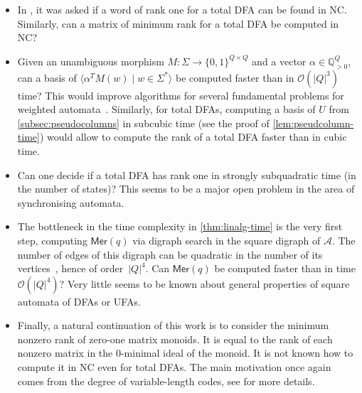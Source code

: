 \documentclass[11pt,a4paper]{amsart}
\newcommand{\OO}{\mathcal{O}}
\newcommand{\Aa}{\mathcal{A}}
\newcommand{\NC}{\textnormal{\textsf{NC}}\xspace}
\newcommand{\spn}[1]{\mathord{\langle #1 \rangle}}
\newcommand{\Mer}{\mathsf{Mer}}
\theoremstyle{plain}
\theoremstyle{definition}
\theoremstyle{defC}
\theoremstyle{thmC}
\theoremstyle{plain}
\numberwithin{equation}{section}
\begin{document}
\begin{itemize}
    \item In \cite{Eppstein1990}, it was asked if a word of rank one for a total DFA can be found in \NC. Similarly, can a matrix of minimum rank for a total DFA be computed in \NC?

    \item Given an unambiguous morphism $M \colon \Sigma \to \{0, 1\}^{Q \times Q}$ and a vector $\alpha \in \mathbb{Q}_{>0}^Q$, can a basis of  $\spn{\alpha^T M(w) \mid w \in \Sigma^*}$ be computed faster than in $\OO(|Q|^3)$ time? This would improve algorithms for several fundamental problems for weighted automata~\cite{KieferWeighted20}. Similarly, for total DFAs, computing a basis of $U$ from \autoref{subsec:pseudocolumns} in subcubic time (see the proof of \autoref{lem:pseudcolumn-time}) would allow to compute the rank of a total DFA faster than in cubic time.

    \item Can one decide if a total DFA has rank one in strongly subquadratic time (in the number of states)? This seems to be a major open problem in the area of synchronising automata.
    
    \item The bottleneck in the time complexity in \autoref{thm:linalg-time} is the very first step, computing $\Mer(q)$ via digraph search in the square digraph of $\Aa$. The number of edges of this digraph can be quadratic in the number of its vertices~\cite[Appendix A]{Kiefer2019Arxiv}, hence of order~$|Q|^4$. Can $\Mer(q)$ be computed faster than in time $\OO(|Q|^4)$? Very little seems to be known about general properties of square automata of DFAs or UFAs.

    \item Finally, a natural continuation of this work is to consider the minimum nonzero rank of zero-one matrix monoids. It is equal to the rank of each nonzero matrix in the 0-minimal ideal of the monoid. It is not known how to compute it in \NC even for total DFAs. The main motivation once again comes from the degree of variable-length codes, see \cite[Chapter 9]{Berstel2010} for more details. 
\end{itemize}
\end{document}
